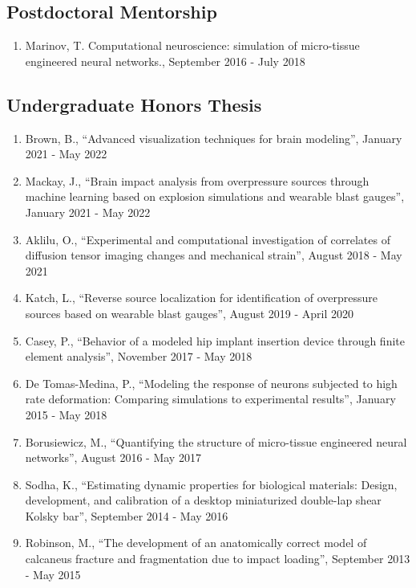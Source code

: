 \documentclass[a4paper,10pt]{article}
\begin{document}
    \subsection*{Postdoctoral Mentorship}
    \begin{enumerate}
    
        \item Marinov, T. Computational neuroscience: simulation of micro-tissue engineered neural networks., September 2016 - July 2018
        
    \end{enumerate}
    
    \subsection*{Undergraduate Honors Thesis}
    \begin{enumerate}
    
        \item Brown, B., ``Advanced visualization techniques for brain modeling'', January 2021 - May 2022
        
        \item Mackay, J., ``Brain impact analysis from overpressure sources through machine learning based on explosion simulations and wearable blast gauges'', January 2021 - May 2022
        
        \item Aklilu, O., ``Experimental and computational investigation of correlates of diffusion tensor imaging changes and mechanical strain'', August 2018 - May 2021
        
        \item Katch, L., ``Reverse source localization for identification of overpressure sources based on wearable blast gauges'', August 2019 - April 2020
        
        \item Casey, P., ``Behavior of a modeled hip implant insertion device through finite element analysis'', November 2017 - May 2018
        
        \item De Tomas-Medina, P., ``Modeling the response of neurons subjected to high rate deformation: Comparing simulations to experimental results'', January 2015 - May 2018
        
        \item Borusiewicz, M., ``Quantifying the structure of micro-tissue engineered neural networks'', August 2016 - May 2017
        
        \item Sodha, K., ``Estimating dynamic properties for biological materials: Design, development, and calibration of a desktop miniaturized double-lap shear Kolsky bar'', September 2014 - May 2016
        
        \item Robinson, M., ``The development of an anatomically correct model of calcaneus fracture and fragmentation due to impact loading'', September 2013 - May 2015
        
    \end{enumerate}
    
\end{document}

